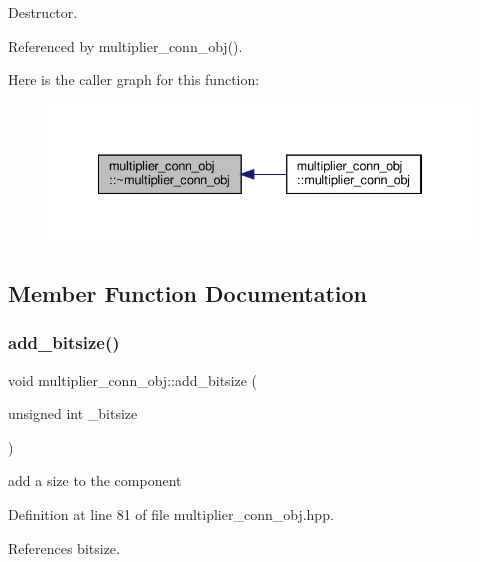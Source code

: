 Destructor. 



Referenced by multiplier\+\_\+conn\+\_\+obj().

Here is the caller graph for this function\+:
\nopagebreak
\begin{figure}[H]
\begin{center}
\leavevmode
\includegraphics[width=334pt]{db/ddc/classmultiplier__conn__obj_a8cad7eb5d13aea13f8b82610713f996d_icgraph}
\end{center}
\end{figure}


\subsection{Member Function Documentation}
\mbox{\label{classmultiplier__conn__obj_a9ce8bf9aa33ae8b2a47df6bde3f122e7}} 
\subsubsection{\texorpdfstring{add\+\_\+bitsize()}{add\_bitsize()}}
{\footnotesize\ttfamily void multiplier\+\_\+conn\+\_\+obj\+::add\+\_\+bitsize (\begin{DoxyParamCaption}\item[{unsigned int}]{\+\_\+bitsize }\end{DoxyParamCaption})\hspace{0.3cm}{\ttfamily [inline]}}



add a size to the component 



Definition at line 81 of file multiplier\+\_\+conn\+\_\+obj.\+hpp.



References bitsize.

\mbox{\label{classmultiplier__conn__obj_a6d31a08d7accc710bc980f085af5ffa8}} 
